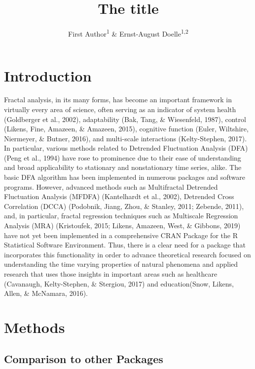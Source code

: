 \documentclass[
  english,
  man]{apa6}
\title{The title}
\author{First Author\textsuperscript{1} \& Ernst-August Doelle\textsuperscript{1,2}}
\date{}
\affiliation{\vspace{0.5cm}\textsuperscript{1} Wilhelm-Wundt-University\\\textsuperscript{2} Konstanz Business School}
\begin{document}
\maketitle

\hypertarget{introduction}{%
\section{Introduction}\label{introduction}}

Fractal analysis, in its many forms, has become an important framework in virtually every area of science, often serving as an indicator of system health (Goldberger et al., 2002), adaptability (Bak, Tang, \& Wiesenfeld, 1987), control (Likens, Fine, Amazeen, \& Amazeen, 2015), cognitive function (Euler, Wiltshire, Niermeyer, \& Butner, 2016), and multi-scale interactions (Kelty-Stephen, 2017). In particular, various methods related to Detrended Fluctuation Analysis (DFA) (Peng et al., 1994) have rose to prominence due to their ease of understanding and broad applicability to stationary and nonstationary time series, alike. The basic DFA algorithm has been implemented in numerous packages and software programs. However, advanced methods such as Multifractal Detrended Fluctuation Analysis (MFDFA) (Kantelhardt et al., 2002), Detrended Cross Correlation (DCCA) (Podobnik, Jiang, Zhou, \& Stanley, 2011; Zebende, 2011), and, in particular, fractal regression techniques such as Multiscale Regression Analysis (MRA) (Kristoufek, 2015; Likens, Amazeen, West, \& Gibbons, 2019) have not yet been implemented in a comprehensive CRAN Package for the R Statistical Software Environment. Thus, there is a clear need for a package that incorporates this functionality in order to advance theoretical research focused on understanding the time varying properties of natural phenomena and applied research that uses those insights in important areas such as healthcare (Cavanaugh, Kelty-Stephen, \& Stergiou, 2017) and education(Snow, Likens, Allen, \& McNamara, 2016).

\hypertarget{methods}{%
\section{Methods}\label{methods}}

\hypertarget{comparison-to-other-packages}{%
\subsection{Comparison to other Packages}\label{comparison-to-other-packages}}
\end{document}

